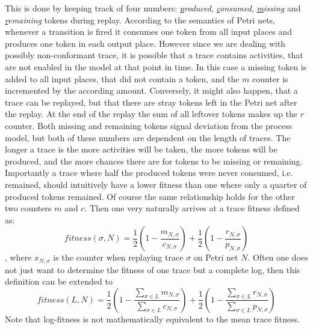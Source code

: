 \documentclass[runningheads]{template/llncs}
\begin{document}
This is done by keeping track of four numbers: \emph{\underline{p}roduced}, \emph{\underline{c}onsumed}, \emph{\underline{m}issing} and \emph{\underline{r}emaining} tokens during replay.
According to the semantics of Petri nets, whenever a transition is fired it consumes one token from all input places and produces one token in each output place.
However since we are dealing with possibly non-conformant trace, it is possible that a trace contains activities, that are not enabled in the model at that point in time.
In this case a missing token is added to all input places, that did not contain a token, and the $m$ counter is incremented by the according amount.
Conversely, it might also happen, that a trace can be replayed, but that there are stray tokens left in the Petri net after the replay. 
At the end of the replay the sum of all leftover tokens makes up the $r$ counter. 
Both missing and remaining tokens signal deviation from the process model, but both of these numbers are dependent on the length of traces.
The longer a trace is the more activities will be taken, the more tokens will be produced, and the more chances there are for tokens to be missing or remaining.
Importantly a trace where half the produced tokens were never consumed, i.e. remained, should intuitively have a lower fitness than one where only a quarter of produced tokens remained.
Of course the same relationship holds for the other two counters $m$ and $c$.
Then one very naturally arrives at a trace fitness defined as:
\begin{equation}
fitness(\sigma,N) = \frac{1}{2}(1-\frac{m_{N,\sigma}}{c_{N,\sigma}})+\frac{1}{2}(1-\frac{r_{N,\sigma}}{p_{N,\sigma}})
\end{equation}
, where $x_{N,\sigma}$ is the counter when replaying trace $\sigma$ on Petri net $N$.
Often one does not just want to determine the fitness of one trace but a complete log, then this definition can be extended to 
\begin{equation}
	fitness(L,N) = \frac{1}{2}(1-\frac{\sum_{\sigma\in L}m_{N,\sigma}}{\sum_{\sigma\in L}c_{N,\sigma}})+\frac{1}{2}(1-\frac{\sum_{\sigma\in L}r_{N,\sigma}}{\sum_{\sigma\in L}p_{N,\sigma}})
\end{equation}
Note that log-fitness is not mathematically equivalent to the mean trace fitness.
\end{document}
